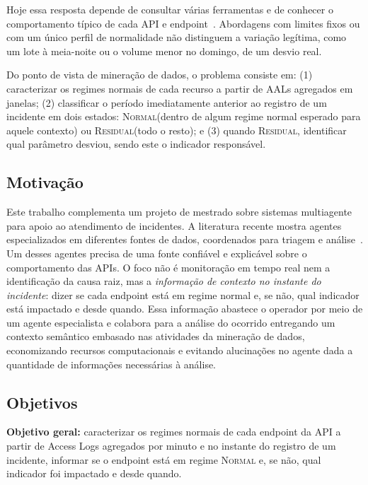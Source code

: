 \documentclass[sigconf,nonacm]{acmart}
\newcommand{\Normal}{\textsc{Normal}\xspace}
\newcommand{\Residual}{\textsc{Residual}\xspace}
\begin{document}
Hoje essa resposta depende de consultar várias ferramentas e de conhecer o comportamento típico de cada API e endpoint~\citep{zhang2025isre}. Abordagens com limites fixos ou com um único perfil de normalidade não distinguem a variação legítima, como um lote à meia-noite ou o volume menor no domingo, de um desvio real.

Do ponto de vista de mineração de dados, o problema consiste em: (1) caracterizar os regimes normais de cada recurso a partir de AALs agregados em janelas; (2) classificar o período imediatamente anterior ao registro de um incidente em dois estados: \Normal (dentro de algum regime normal esperado para aquele contexto) ou \Residual (todo o resto); e (3) quando \Residual, identificar qual parâmetro desviou, sendo este o indicador responsável.


\subsection{Motivação}
Este trabalho complementa um projeto de mestrado sobre sistemas multiagente para apoio ao atendimento de incidentes. A literatura recente mostra agentes especializados em diferentes fontes de dados, coordenados para triagem e análise~\citep{yu2025triangle,luo2025opsagent,zhang2025isre}. Um desses agentes precisa de uma fonte confiável e explicável sobre o comportamento das APIs. O foco não é monitoração em tempo real nem a identificação da causa raiz, mas a \emph{informação de contexto no instante do incidente}: dizer se cada endpoint está em regime normal e, se não, qual indicador está impactado e desde quando. Essa informação abastece o operador por meio de um agente especialista e colabora para a análise do ocorrido entregando um contexto semântico embasado nas atividades da mineração de dados, economizando recursos computacionais e evitando alucinações no agente dada a quantidade de informações necessárias à análise.

\subsection{Objetivos}
\textbf{Objetivo geral:} caracterizar os regimes normais de cada endpoint da API a partir de Access Logs agregados por minuto e no instante do registro de um incidente, informar se o endpoint está em regime \Normal e, se não, qual indicador foi impactado e desde quando.
\end{document}
